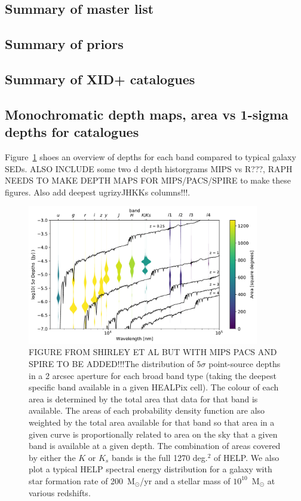 \documentclass[usenatbib]{mnras}
\begin{document}
\subsection{Summary of master list}
\subsection{Summary of priors}
\subsection{Summary of XID+ catalogues}

\subsection{Monochromatic depth maps, area vs 1-sigma depths for catalogues}

Figure~\ref{fig:bands_depths} shoes an overview of depths for each band compared to typical galaxy SEDs. {\color{red} ALSO INCLUDE some two d depth historgrams MIPS vs R???, RAPH NEEDS TO MAKE DEPTH MAPS FOR MIPS/PACS/SPIRE to make these figures. Also add deepest ugrizyJHKKs columns!!!}.

\begin{figure}
\centering
\includegraphics[width=0.9\textwidth]{./figs/band_depths_overviews_areaweighted_with_black_seds_wave}
\caption{\label{fig:bands_depths}{\color{red} FIGURE FROM SHIRLEY ET AL BUT WITH MIPS PACS AND SPIRE TO BE ADDED!!!}The distribution of $5\sigma$ point-source depths in a 2 arcsec aperture for each broad band type (taking the deepest specific band available in a given HEALPix cell). The colour of each area is determined by the total area that data for that band is available. The areas of each probability density function are also weighted by the total area available for that band so that area in a given curve is proportionally related to area on the sky that a given band is available at a given depth. The combination of areas covered by either the $K$ or $K_s$ bands is the full 1270 deg.$^2$ of HELP. We also plot a typical HELP spectral energy distribution for a galaxy with star formation rate of 200~M$_\odot$/yr and a stellar mass of $10^{10}$~M$_\odot$ at various redshifts.}
\end{figure}
\end{document}
